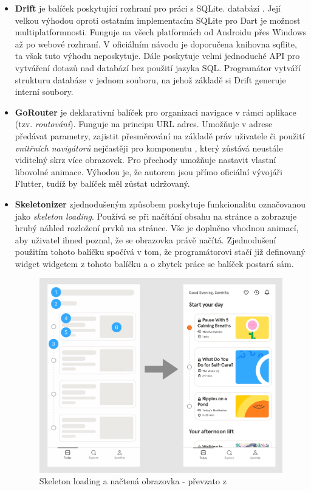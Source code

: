 \documentclass[
  biblatex,
  figures=true,
  tables=false,
  glossaries,
  index
]{kidiplom}
\begin{document}
\begin{itemize}
  \item \textbf{Drift} je balíček poskytující rozhraní pro práci s SQLite.  databází \cite{drift}. Její velkou výhodou oproti ostatním implementacím SQLite pro Dart je možnost multiplatformnosti. Funguje na všech platformách od Androidu přes Windows až po webové rozhraní. V oficiálním návodu je doporučena knihovna sqflite, ta však tuto výhodu neposkytuje. Dále poskytuje velmi jednoduché API pro vytváření dotazů nad databází bez použití jazyka SQL. Programátor vytváří strukturu databáze v jednom souboru, na jehož základě si Drift generuje interní soubory.
  \item \textbf{GoRouter} je deklarativní balíček pro organizaci navigace v rámci aplikace (tzv. \textit{routování}). Funguje na principu URL adres. Umožňuje v adrese předávat parametry, zajistit přesměrování na základě práv uživatele či použití \textit{vnitřních navigátorů} nejčastěji pro komponentu , který zůstává neustále viditelný skrz více obrazovek. Pro přechody umožňuje nastavit vlastní libovolné animace. Výhodou je, že autorem jsou přímo oficiální vývojáři Flutter, tudíž by balíček měl zůstat udržovaný.
  \item \textbf{Skeletonizer} zjednodušeným způsobem poskytuje funkcionalitu označovanou jako \textit{skeleton loading}. Používá se při načítání obsahu na stránce a zobrazuje hrubý náhled rozložení prvků na stránce. Vše je doplněno vhodnou animací, aby uživatel ihned poznal, že se obrazovka právě načítá. Zjednodušení použitím tohoto balíčku spočívá v tom, že programátorovi stačí již definovaný widget  widgetem  z tohoto balíčku a o zbytek práce se balíček postará sám.
  
  \begin{figure}
  	\centering
  	\includegraphics[scale=0.1]{images/skeletonizer.png}
  	\caption{Skeleton loading a načtená obrazovka - převzato z \cite{skeleton}}
  \end{figure}
  

\end{itemize}
\end{document}
